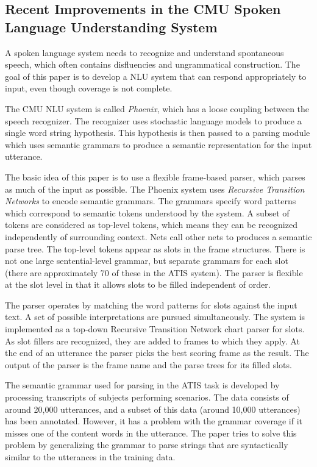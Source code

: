 \subsection{Recent Improvements in the CMU Spoken Language Understanding System \cite{Ward1994}}

A spoken language system needs to recognize and understand spontaneous speech, which often contains disfluencies and ungrammatical construction. The goal of this paper is to develop a NLU system that can respond appropriately to input, even though coverage is not complete.

The CMU NLU system is called \emph{Phoenix}, which has a loose coupling between the speech recognizer. The recognizer uses stochastic language models to produce a single word string hypothesis. This hypothesis is then passed to a parsing module which uses semantic grammars to produce a semantic representation for the input utterance.

The basic idea of this paper is to use a flexible frame-based parser, which parses as much of the input as possible. The Phoenix system uses \emph{Recursive Transition Networks} to encode semantic grammars. The grammars specify word patterns which correspond to semantic tokens understood by the system. A subset of tokens are considered as top-level tokens, which means they can be recognized independently of surrounding context. Nets call other nets to produces a semantic parse tree. The top-level tokens appear as slots in the frame structures. There is not one large sentential-level grammar, but separate grammars for each slot (there are approximately 70 of these in the ATIS system). The parser is flexible at the slot level in that it allows slots to be filled independent of order.

The parser operates by matching the word patterns for slots against the input text. A set of possible interpretations are pursued simultaneously. The system is implemented as a top-down Recursive Transition Network chart parser for slots. As slot fillers are recognized, they are added to frames to which they apply. At the end of an utterance the parser picks the best scoring frame as the result. The output of the parser is the frame name and the parse trees for its filled slots.

The semantic grammar used for parsing in the ATIS task is developed by processing transcripts of subjects performing scenarios. The data consists of around 20,000 utterances, and a subset of this data (around 10,000 utterances) has been annotated. However, it has a problem with the grammar coverage if it misses one of the content words in the utterance. The paper tries to solve this problem by generalizing the grammar to parse strings that are syntactically similar to the utterances in the training data.

